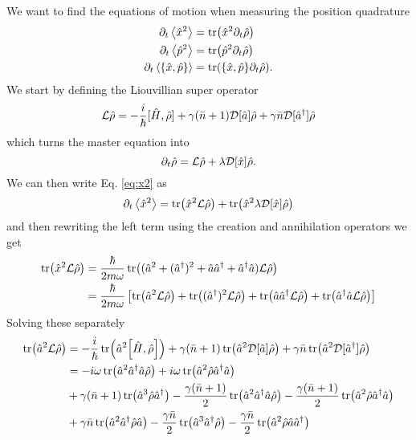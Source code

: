 We want to find the equations of motion when measuring the position quadrature
\begin{align}
    \dt\expval{\xop^2} &= \tr(\xop^2 \dt \dmatrix)\label{eq:x2} \\
    \dt\expval{\pop^2} &= \tr(\pop^2 \dt \dmatrix)\label{eq:p2}\\
    \dt\expval{\acomm{\xop}{\pop}} &= \tr(\acomm{\xop}{\pop} \dt \dmatrix). \label{eq:xp}
\end{align}
We start by defining the Liouvillian super operator
\begin{equation}
    \mathcal{L}\hat{\rho} = -\frac{i}{\hbar} [\hat{H}, \hat{\rho}] + \gamma (\bar{n} + 1 ) \mathcal{D}[\hat{a}] \hat{\rho} + \gamma \bar{n} \mathcal{D}[\hat{a}^{\dagger}] \hat{\rho}
\end{equation}
which turns the master equation into
\begin{equation}
    \partial_t \hat{\rho} = \mathcal{L}\hat{\rho} + \lambda \mathcal{D}[\hat{x}] \hat{\rho}.
\end{equation}
We can then write Eq. \eqref{eq:x2} as 
\begin{equation}
    \partial_t\expval{\hat{x}^2} = \tr(\hat{x}^2 \mathcal{L}\hat{\rho}) + \tr(\hat{x}^2 \lambda \mathcal{D}[\hat{x}] \hat{\rho})
\end{equation}
and then rewriting the left term using the creation and annihilation operators we get
\begin{align}
    \tr(\hat{x}^2 \mathcal{L}\hat{\rho}) &= \frac{\hbar}{2m \omega} \tr((\hat{a}^2 + (\hat{a}^{\dagger})^2 + \hat{a}\hat{a}^{\dagger} + \hat{a}^{\dagger}\hat{a}) \mathcal{L}\hat{\rho} )\\ 
    &= \frac{\hbar}{2 m \omega} \left[ \tr(\hat{a}^2 \mathcal{L}\hat{\rho}) + \tr((\hat{a}^{\dagger})^2 \mathcal{L}\hat{\rho}) + \tr(\hat{a}\hat{a}^{\dagger} \mathcal{L}\hat{\rho}) + \tr(\hat{a}^{\dagger}\hat{a} \mathcal{L}\hat{\rho})\right]
\end{align}
Solving these separately
\begin{align}
    \tr(\a^2 \mathcal{L} \dmatrix) &= -\frac{i}{\hbar}\tr(\a^2\comm{\hamiltonian}{\dmatrix}) + \gamma(\nbar + 1)\tr(\a^2 \mathcal{D}[\a]\dmatrix) + \gamma \nbar \tr(\a^2 \mathcal{D}[\ad]\dmatrix)\\
    &= -i\omega \tr(\a^2 \ad\a \dmatrix) + i \omega \tr(\a^2\dmatrix \ad\a)\\ 
    &+ \gamma(\nbar + 1) \tr(\a^3 \dmatrix \ad)- \frac{\gamma(\nbar + 1)}{2} \tr(\a^2\ad\a \dmatrix) - \frac{\gamma(\nbar + 1)}{2} \tr(\a^2 \dmatrix \ad\a)\\
    &+ \gamma \nbar \tr(\a^2\ad \dmatrix \a) - \frac{\gamma \nbar}{2} \tr(\a^3 \ad \dmatrix) - \frac{\gamma \nbar}{2} \tr(\a^2 \dmatrix \a\ad)\\
\end{align}
